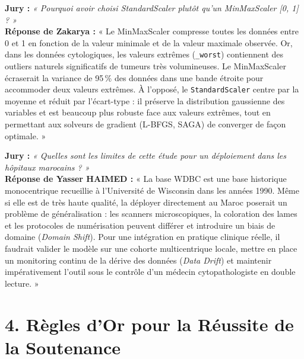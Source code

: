 \documentclass[a4paper,11pt]{article}
\begin{document}
\begin{tcolorbox}[qabox, title={\textbf{Question 7 (Pré-traitement) -- Assignée à Zakarya KAIROUCH}}]
	\textbf{Jury :} \textit{« Pourquoi avoir choisi StandardScaler plutôt qu'un MinMaxScaler [0, 1] ? »}\\
	\textbf{Réponse de Zakarya :}
	« Le MinMaxScaler compresse toutes les données entre 0 et 1 en fonction de la valeur minimale et de la valeur maximale observée. Or, dans les données cytologiques, les valeurs extrêmes (\texttt{\_worst}) contiennent des outliers naturels significatifs de tumeurs très volumineuses. Le MinMaxScaler écraserait la variance de 95\,\% des données dans une bande étroite pour accommoder deux valeurs extrêmes. À l'opposé, le \texttt{StandardScaler} centre par la moyenne et réduit par l'écart-type : il préserve la distribution gaussienne des variables et est beaucoup plus robuste face aux valeurs extrêmes, tout en permettant aux solveurs de gradient (L-BFGS, SAGA) de converger de façon optimale. »
\end{tcolorbox}

\begin{tcolorbox}[qabox, title={\textbf{Question 8 (Généralisation \& Déploiement) -- Assignée à Yasser HAIMED}}]
	\textbf{Jury :} \textit{« Quelles sont les limites de cette étude pour un déploiement dans les hôpitaux marocains ? »}\\
	\textbf{Réponse de Yasser HAIMED :}
	« La base WDBC est une base historique monocentrique recueillie à l'Université de Wisconsin dans les années 1990. Même si elle est de très haute qualité, la déployer directement au Maroc poserait un problème de généralisation : les scanners microscopiques, la coloration des lames et les protocoles de numérisation peuvent différer et introduire un biais de domaine (\textit{Domain Shift}). Pour une intégration en pratique clinique réelle, il faudrait valider le modèle sur une cohorte multicentrique locale, mettre en place un monitoring continu de la dérive des données (\textit{Data Drift}) et maintenir impérativement l'outil sous le contrôle d'un médecin cytopathologiste en double lecture. »
\end{tcolorbox}

\vspace{0.4cm}
\section*{\color{primarygreen}4. Règles d'Or pour la Réussite de la Soutenance}
\end{document}
